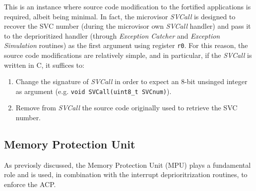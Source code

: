 \documentclass{article}
\begin{document}
This is an instance where source code modification to the fortified applications is required, albeit being minimal. In fact, the microvisor \textit{SVCall} is designed to recover the SVC number (during the microvisor own \textit{SVCall} handler) and pass it to the deprioritized handler (through \textit{Exception Catcher} and \textit{Exception Simulation} routines) as the first argument using register \verb|r0|.
For this reason, the source code modifications are relatively simple, and in particular, if the \textit{SVCall} is written in C, it suffices to:
\begin{enumerate}
	\item Change the signature of \textit{SVCall} in order to expect an 8-bit unsinged integer as argument (e.g. \verb|void SVCall(uint8_t SVCnum)|).
	\item Remove from \textit{SVCall} the source code originally used to retrieve the SVC number.
\end{enumerate}

\subsection{Memory Protection Unit}
\label{subsec:MPU}
As previosly discussed, the Memory Protection Unit (MPU) plays a fundamental role and is used, in combination with the interrupt deprioritrization routines, to enforce the ACP.
\end{document}
